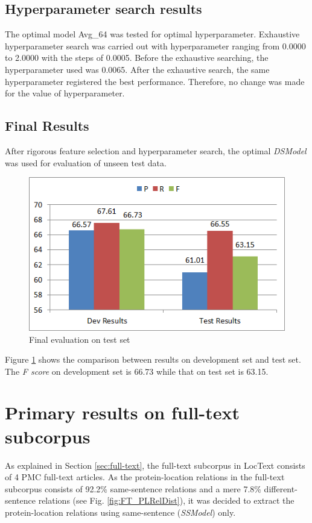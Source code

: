 \subsection{Hyperparameter search results}

The optimal model Avg\_64 was tested for optimal hyperparameter. Exhaustive hyperparameter search was carried out with hyperparameter ranging from 0.0000 to 2.0000 with the steps of 0.0005. Before the exhaustive searching, the hyperparameter used was 0.0065. After the exhaustive search, the same hyperparameter registered the best performance. Therefore, no change was made for the value of hyperparameter.

\subsection{Final Results}

After rigorous feature selection and hyperparameter search, the optimal \textit{DSModel} was used for evaluation of unseen test data.

\begin{figure}
\centering
\includegraphics[scale=0.7]{figures/DSFinalResults.png}
\caption{Final evaluation on test set}\label{fig:DSFinal}
\end{figure}

Figure \ref{fig:DSFinal} shows the comparison between results on development set and test set. The \textit{F score} on development set is 66.73 while that on test set is 63.15.

\section{Primary results on full-text subcorpus} \label{sec:FTPrimaryRes}

As explained in Section \ref{sec:full-text}, the full-text subcorpus in LocText consists of 4 PMC \cite{pmc} full-text articles. As the protein-location relations in the full-text subcorpus consists of 92.2\% same-sentence relations and a mere 7.8\% different-sentence relations (see Fig. \ref{fig:FT_PLRelDist}), it was decided to extract the protein-location relations using same-sentence (\textit{SSModel}) only.

